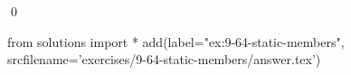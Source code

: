 
\begin{ex}
  \label{ex:9-64-static-members}
  
  \qed
\end{ex}
\begin{python0}
from solutions import *
add(label="ex:9-64-static-members",
    srcfilename='exercises/9-64-static-members/answer.tex')
\end{python0}
